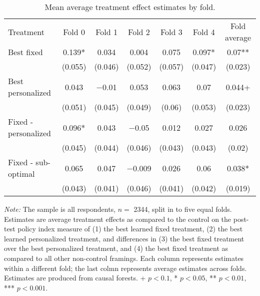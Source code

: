 \begin{table*}

\caption{Mean average treatment effect estimates by fold. \label{tab:fold_estimates}}
\centering
\begin{threeparttable}
\begin{tabular}[t]{lcccccc}
\toprule
Treatment & Fold 0 & Fold 1 & Fold 2 & Fold 3 & Fold 4 & Fold average\\
\cmidrule(lr){2-2} \cmidrule(lr){3-3} \cmidrule(lr){4-4} \cmidrule(lr){5-5} \cmidrule(lr){6-6} \cmidrule(lr){7-7}
Best fixed & \num{0.139}* & \num{0.034} & \num{0.004} & \num{0.075} & \num{0.097}* & \num{0.07}**\\
 & (\num{0.055}) & (\num{0.046}) & (\num{0.052}) & (\num{0.057}) & (\num{0.047}) & (\num{0.023})\\
\addlinespace
Best personalized & \num{0.043} & \num{-0.01} & \num{0.053} & \num{0.063} & \num{0.07} & \num{0.044}+\\
 & (\num{0.051}) & (\num{0.045}) & (\num{0.049}) & (\num{0.06}) & (\num{0.053}) & (\num{0.023})\\
\addlinespace
Fixed - personalized & \num{0.096}* & \num{0.043} & \num{-0.05} & \num{0.012} & \num{0.027} & \num{0.026}\\
 & (\num{0.045}) & (\num{0.044}) & (\num{0.046}) & (\num{0.043}) & (\num{0.043}) & (\num{0.02})\\
\addlinespace
Fixed - sub-optimal & \num{0.065} & \num{0.047} & \num{-0.009} & \num{0.026} & \num{0.06} & \num{0.038}*\\
 & (\num{0.043}) & (\num{0.041}) & (\num{0.046}) & (\num{0.041}) & (\num{0.042}) & (\num{0.019})\\
\bottomrule
\end{tabular}
\begin{tablenotes}
\item \footnotesize \textit{Note:} The sample is all respondents, $n = $ \num{2344}, split in to five equal folds. Estimates are average treatment effects as compared to the control on the post-test policy index measure of (1) the best learned fixed treatment, (2) the best learned personalized treatment, and differences in (3) the best fixed treatment over the best personalized treatment, and (4) the best fixed treatment as compared to all other non-control framings. Each column represents estimates within a different fold; the last colmn represents average estimates across folds. Estimates are produced from causal forests.  + $p < 0.1$, * $p < 0.05$, ** $p < 0.01$, *** $p < 0.001$.
\end{tablenotes}
\end{threeparttable}
\end{table*}
